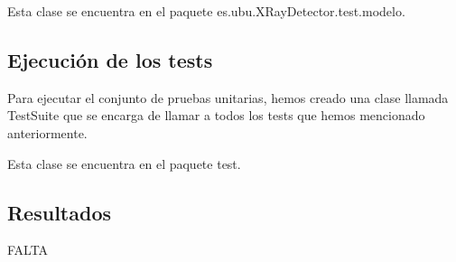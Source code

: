 Esta clase se encuentra en el paquete es.ubu.XRayDetector.test.modelo.

\subsection{Ejecución de los tests}
Para ejecutar el conjunto de pruebas unitarias, hemos creado una clase llamada TestSuite que se encarga de llamar a todos los tests que hemos mencionado anteriormente.

Esta clase se encuentra en el paquete test.

\subsection{Resultados}
FALTA

 
